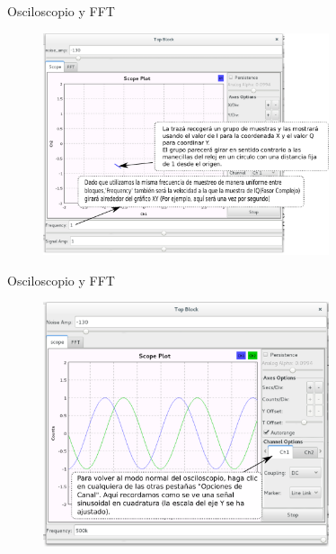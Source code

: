 \begin{frame}{Osciloscopio y FFT}
\begin{figure}[H]
\centering
\includegraphics[width=0.75\textwidth]{lab2/pdf/lab2_13.pdf}
\end{figure}
\end{frame}

\begin{frame}{Osciloscopio y FFT}
\begin{figure}[H]
\vspace{-3mm}
\centering
\includegraphics[width=0.75\textwidth]{lab2/pdf/lab2_14.pdf}
\end{figure}
\end{frame}

